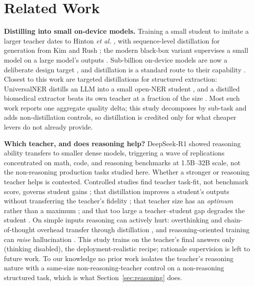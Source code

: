 \documentclass[10pt,journal]{IEEEtran}
\begin{document}
\section{Related Work}\label{sec:related}
\textbf{Distilling into small on-device models.} Training a small student to imitate a larger teacher dates to Hinton \emph{et al.} \cite{hinton2015}, with sequence-level distillation for generation from Kim and Rush \cite{kimrush2016}; the modern black-box variant supervises a small model on a large model's outputs \cite{xusurvey2024, zhu2023}. Sub-billion on-device models are now a deliberate design target \cite{yang2025, liu2024mobilellm}, and distillation is a standard route to their capability \cite{rang2025}. Closest to this work are targeted distillations for structured extraction: UniversalNER distills an LLM into a small open-NER student \cite{zhou2023universalner}, and a distilled biomedical extractor beats its own teacher at a fraction of the size \cite{gu2023biomedical}. Most such work reports one aggregate quality delta; this study decomposes by sub-task and adds non-distillation controls, so distillation is credited only for what cheaper levers do not already provide.

\textbf{Which teacher, and does reasoning help?} DeepSeek-R1 \cite{deepseek2025} showed reasoning ability transfers to smaller dense models, triggering a wave of replications \cite{zhang2025, li2025} concentrated on math, code, and reasoning benchmarks at 1.5B--32B scale, not the non-reasoning production tasks studied here. Whether a stronger or reasoning teacher helps is contested. Controlled studies find teacher task-fit, not benchmark score, governs student gains \cite{chen2025factors}; that distillation improves a student's outputs without transferring the teacher's fidelity \cite{ramesh2025}; that teacher size has an \emph{optimum} rather than a maximum \cite{busbridge2025}; and that too large a teacher--student gap degrades the student \cite{mirzadeh2020}. On simple inputs reasoning can actively hurt: overthinking and chain-of-thought overhead transfer through distillation \cite{chen2024overthink, zheng2025cot, aggarwal2025}, and reasoning-oriented training can \emph{raise} hallucination \cite{yao2025}. This study trains on the teacher's final answers only (thinking disabled), the deployment-realistic recipe; rationale supervision \cite{hsieh2023} is left to future work. To our knowledge no prior work isolates the teacher's reasoning nature with a same-size non-reasoning-teacher control on a non-reasoning structured task, which is what Section~\ref{sec:reasoning} does.
\end{document}
